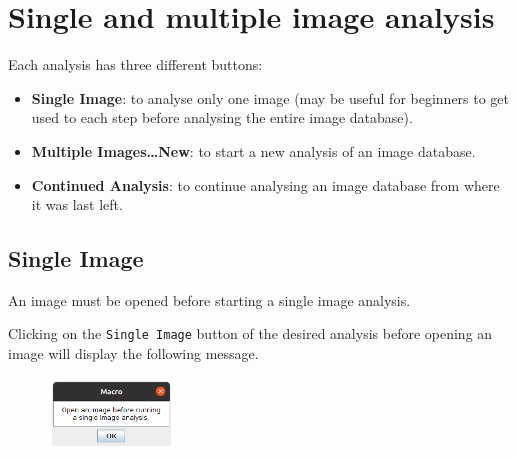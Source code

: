 \documentclass[
  letterpaper,
]{scrbook}
\providecommand{\tightlist}{%
  \setlength{\itemsep}{0pt}\setlength{\parskip}{0pt}}\usepackage{longtable,booktabs,array}
\begin{document}
\hypertarget{sec-setup}{%
\section{Single and multiple image analysis}\label{sec-setup}}

Each analysis has three different buttons:

\begin{itemize}
\tightlist
\item
  \textbf{Single Image}: to analyse only one image (may be useful for
  beginners to get used to each step before analysing the entire image
  database).
\item
  \textbf{Multiple Images\ldots New}: to start a new analysis of an
  image database.
\item
  \textbf{Continued Analysis}: to continue analysing an image database
  from where it was last left.
\end{itemize}

\hypertarget{single-image}{%
\subsection{Single Image}\label{single-image}}

\begin{tcolorbox}[standard jigsaw,bottomtitle=1mm, toptitle=1mm, colframe=quarto-callout-warning-color-frame, colbacktitle=quarto-callout-warning-color!10!white, title=\textcolor{quarto-callout-warning-color}{\faExclamationTriangle}\hspace{0.5em}{Warning}, titlerule=0mm, opacityback=0, arc=.35mm, opacitybacktitle=0.6, rightrule=.15mm, toprule=.15mm, coltitle=black, left=2mm, colback=white, leftrule=.75mm, bottomrule=.15mm]
An image must be opened before starting a single image analysis.
\end{tcolorbox}

Clicking on the \texttt{Single\ Image} button of the desired analysis
before opening an image will display the following message.

\begin{figure}

{\centering \includegraphics[width=0.3\textwidth,height=\textheight]{./images/screenshots/single_image_error.png}

}

\end{figure}
\end{document}
